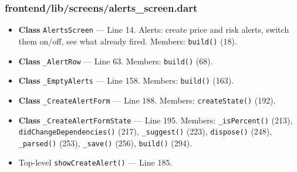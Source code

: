 \subsubsection*{frontend/lib/screens/alerts\_screen.dart}
\begin{itemize}[nosep,leftmargin=1.5em]
\item \textbf{Class} \texttt{AlertsScreen} --- Line 14. Alerts: create price and risk alerts, switch them on/off, see what already fired. Members: \texttt{build(\allowbreak{})} (18).
\item \textbf{Class} \texttt{\_\allowbreak{}AlertRow} --- Line 63. Members: \texttt{build(\allowbreak{})} (68).
\item \textbf{Class} \texttt{\_\allowbreak{}EmptyAlerts} --- Line 158. Members: \texttt{build(\allowbreak{})} (163).
\item \textbf{Class} \texttt{\_\allowbreak{}CreateAlertForm} --- Line 188. Members: \texttt{createState(\allowbreak{})} (192).
\item \textbf{Class} \texttt{\_\allowbreak{}CreateAlertFormState} --- Line 195. Members: \texttt{\_\allowbreak{}isPercent(\allowbreak{})} (213), \texttt{didChangeDependencies(\allowbreak{})} (217), \texttt{\_\allowbreak{}suggest(\allowbreak{})} (223), \texttt{dispose(\allowbreak{})} (248), \texttt{\_\allowbreak{}parsed(\allowbreak{})} (253), \texttt{\_\allowbreak{}save(\allowbreak{})} (256), \texttt{build(\allowbreak{})} (294).
\item Top-level \texttt{showCreateAlert(\allowbreak{})} --- Line 185.
\end{itemize}
